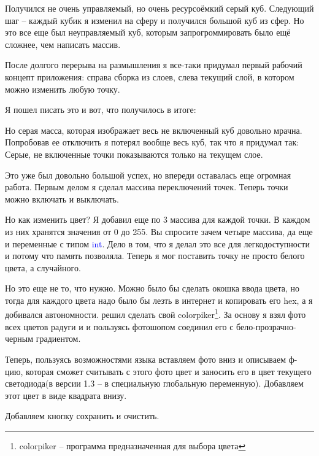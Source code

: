 \documentclass[a4paper, 12pt]{article}
\begin{document}
Получился не очень управляемый, но очень ресурсоёмкий серый куб. Следующий шаг
-- каждый кубик я изменил на сферу и получился большой куб из сфер.
Но это все еще был неуправляемый куб, которым запрогроммировать было ещё
сложнее, чем написать массив.

После долгого перерыва на размышления я все-таки придумал первый рабочий
концепт приложения: справа сборка из слоев, слева текущий слой, в котором
можно изменить любую точку.

Я пошел писать это и вот, что получилось в итоге:


Но серая масса, которая изображает весь не включенный куб довольно мрачна.
Попробовав ее отключить я потерял вообще весь куб, так что я придумал так:
Серые, не включенные точки показываются только на текущем слое.


Это уже был довольно большой успех, но впереди оставалась еще огромная работа.
Первым делом я сделал массива переключений точек. Теперь точки можно включать и
выключать.


Но как изменить цвет? Я добавил еще по 3 массива для каждой точки. В каждом из
них хранятся значения от 0 до 255. Вы спросите зачем четыре массива, да еще и
переменные с типом \textcolor{blue}{int}. Дело в том, что я делал это все для
легкодоступности и потому что память позволяла. Теперь я мог поставить точку
не просто белого цвета, а случайного.


Но это еще не то, что нужно. Можно было бы сделать окошка ввода цвета, но тогда
для каждого цвета надо было бы лезть в интернет и копировать его hex, а я
добивался автономности. решил сделать свой colorpiker\footnote{colorpiker --
  программа предназначенная для выбора цвета}. За основу я взял фото всех цветов
радуги и и пользуясь фотошопом соединил его с бело-прозрачно-черным градиентом.


Теперь, пользуясь возможностями языка вставляем фото вниз и описываем ф-цию,
которая сможет считывать с этого фото цвет и заносить его в цвет текущего
светодиода(в версии 1.3 -- в специальную глобальную переменную). Добавляем
этот цвет в виде квадрата внизу.


Добавляем кнопку сохранить и очистить.
\end{document}
